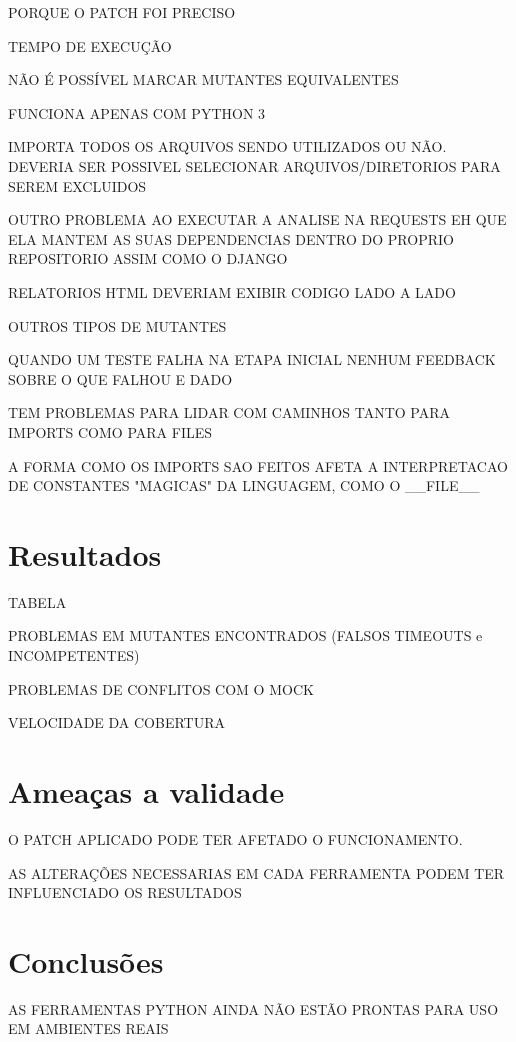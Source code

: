 \documentclass[12pt]{article}
\begin{document}
PORQUE O PATCH FOI PRECISO

TEMPO DE EXECUÇÃO

NÃO É POSSÍVEL MARCAR MUTANTES EQUIVALENTES

FUNCIONA APENAS COM PYTHON 3

IMPORTA TODOS OS ARQUIVOS SENDO UTILIZADOS OU NÃO. DEVERIA SER POSSIVEL SELECIONAR ARQUIVOS/DIRETORIOS
PARA SEREM EXCLUIDOS

OUTRO PROBLEMA AO EXECUTAR A ANALISE NA REQUESTS EH QUE ELA MANTEM AS SUAS DEPENDENCIAS DENTRO DO PROPRIO REPOSITORIO
ASSIM COMO O DJANGO

RELATORIOS HTML DEVERIAM EXIBIR CODIGO LADO A LADO

OUTROS TIPOS DE MUTANTES

QUANDO UM TESTE FALHA NA ETAPA INICIAL NENHUM FEEDBACK SOBRE O QUE FALHOU E DADO

TEM PROBLEMAS PARA LIDAR COM CAMINHOS TANTO PARA IMPORTS COMO PARA FILES

A FORMA COMO OS IMPORTS SAO FEITOS AFETA A INTERPRETACAO DE CONSTANTES "MAGICAS" DA LINGUAGEM, COMO O \_\_FILE\_\_



\section{Resultados}

TABELA

PROBLEMAS EM MUTANTES ENCONTRADOS (FALSOS TIMEOUTS e INCOMPETENTES)

PROBLEMAS DE CONFLITOS COM O MOCK

VELOCIDADE DA COBERTURA

\section{Ameaças a validade}

O PATCH APLICADO PODE TER AFETADO O FUNCIONAMENTO.

AS ALTERAÇÕES NECESSARIAS EM CADA FERRAMENTA PODEM TER INFLUENCIADO OS RESULTADOS

\section{Conclusões}

AS FERRAMENTAS PYTHON AINDA NÃO ESTÃO PRONTAS PARA USO EM AMBIENTES REAIS
\end{document}
